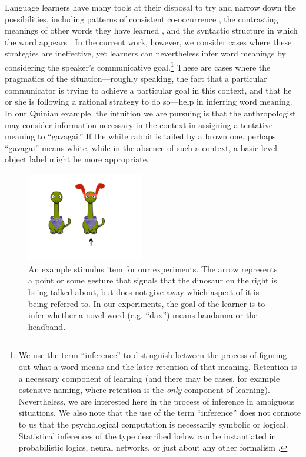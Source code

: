 \documentclass[man,noapacite]{apa2}
\begin{document}
Language learners have many tools at their disposal to try and narrow down the possibilities, including patterns of consistent co-occurrence \cite{yu2007b}, the contrasting meanings of other words they have learned \cite{clark1988,markman1988}, and the syntactic structure in which the word appears \cite{gleitman1990}. In the current work, however, we consider cases where these strategies are ineffective, yet learners can nevertheless infer word meanings by considering the speaker's communicative goal.\footnote{We use the term ``inference'' to distinguish between the process of figuring out what a word means and the later retention of that meaning. Retention is a necessary component of learning (and there may be cases, for example ostensive naming, where retention is the \emph{only} component of learning). Nevertheless, we are interested here in the process of inference in ambiguous situations. We also note that the use of the term ``inference'' does not connote to us that the psychological computation is necessarily symbolic or logical. Statistical inferences of the type described below can be instantiated in probabilistic logics, neural networks, or just about any other formalism \cite{mackay2003}.} These are cases where the pragmatics of the situation---roughly speaking, the fact that a particular communicator is trying to achieve a particular goal in this context, and that he or she is following a rational strategy to do so---help in inferring word meaning.  In our Quinian example, the intuition we are pursuing is that the anthropologist may consider information necessary in the context in assigning a tentative meaning to ``gavagai.'' If the white rabbit is tailed by a brown one, perhaps ``gavagai'' means {\sc white}, while in the absence of such a context, a basic level object label might be more appropriate.

\begin{figure}[tr]
\begin{center}
\includegraphics[width=2in]{figures/stims_simple.pdf}
\caption{\label{fig:stims} An example stimulus item for our experiments. The arrow represents a point or some gesture that signals that the dinosaur on the right is being talked about, but does not give away which aspect of it is being referred to. In our experiments, the goal of the learner is to infer whether a novel word (e.g. ``dax'') means {\sc bandanna} or the {\sc headband}.}
\end{center}
\end{figure}
\end{document}
